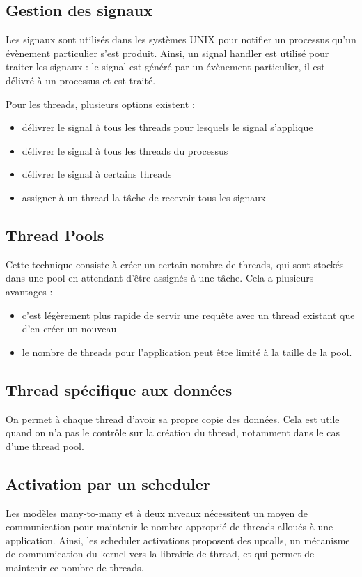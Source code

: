 	
	\subsection{Gestion des signaux}
	
	Les signaux sont utilisés dans les systèmes UNIX pour notifier un processus qu'un évènement particulier s'est produit. Ainsi, un signal handler est utilisé pour traiter les signaux : le signal est généré par un évènement particulier, il est délivré à un processus et est traité.
	
	Pour les threads, plusieurs options existent :
	
	\begin{itemize}
		\item délivrer le signal à tous les threads pour lesquels le signal s'applique
		\item délivrer le signal à tous les threads du processus
		\item délivrer le signal à certains threads
		\item assigner à un thread la tâche de recevoir tous les signaux
	\end{itemize}
	
	\subsection{Thread Pools}
	
	Cette technique consiste à créer un certain nombre de threads, qui sont stockés dans une pool en attendant d'être assignés à une tâche. Cela a plusieurs avantages :
	
	\begin{itemize}
		\item c'est légèrement plus rapide de servir une requête avec un thread existant que d'en créer un nouveau
		\item le nombre de threads pour l'application peut être limité à la taille de la pool.
	\end{itemize}
	
	\subsection{Thread spécifique aux données}
	
	On permet à chaque thread d'avoir sa propre copie des données. Cela est utile quand on n'a pas le contrôle sur la création du thread, notamment dans le cas d'une thread pool.
	
	\subsection{Activation par un scheduler}
	
	Les modèles many-to-many et à deux niveaux nécessitent un moyen de communication pour maintenir le nombre approprié de threads alloués à une application. Ainsi, les scheduler activations proposent des upcalls, un mécanisme de communication du kernel vers la librairie de thread, et qui permet de maintenir ce nombre de threads.